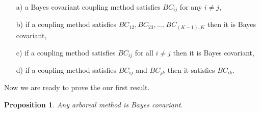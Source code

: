 \documentclass[twoside,11pt]{article}
\newtheorem{prop}{Proposition}
\begin{document}
\begin{itemize}
	\item[a)] a Bayes covariant coupling method satisfies $BC_{ij}$ for any $i\not= j$,
	\item[b)] if a coupling method satisfies $BC_{12}, BC_{23}, \ldots, BC_{(K-1),K}$ then it is Bayes covariant,
	\item[c)] if a coupling method satisfies $BC_{ij}$ for all $i\not= j$ then it is Bayes covariant,
	\item[d)] if a coupling method satisfies $BC_{ij}$ and $BC_{jk}$ then it satisfies $BC_{ik}$.
\end{itemize}

Now we are ready to prove the our first result.

\begin{prop}
Any arboreal method is Bayes covariant.
\end{prop}
\end{document}
